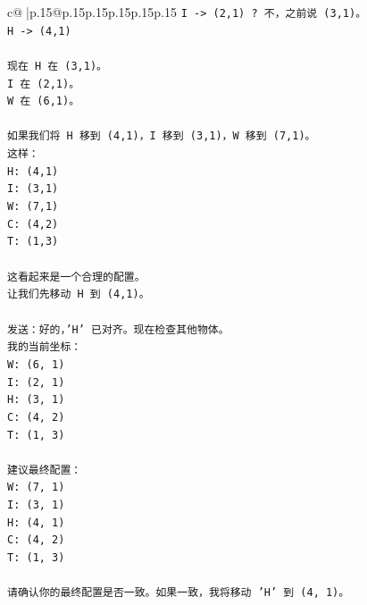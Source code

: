 \documentclass{article}
\begin{document}
{\begin{supertabular}{c@{$\;$}|p{.15\linewidth}@{}p{.15\linewidth}p{.15\linewidth}p{.15\linewidth}p{.15\linewidth}p{.15\linewidth}}
{{{\texttt{I {-}> (2,1) ? 不，之前说 (3,1)。} \\
\texttt{H {-}> (4,1)} \\
\\ 
\texttt{现在 H 在 (3,1)。} \\
\texttt{I 在 (2,1)。} \\
\texttt{W 在 (6,1)。} \\
\\ 
\texttt{如果我们将 H 移到 (4,1)，I 移到 (3,1)，W 移到 (7,1)。} \\
\texttt{这样：} \\
\texttt{H: (4,1)} \\
\texttt{I: (3,1)} \\
\texttt{W: (7,1)} \\
\texttt{C: (4,2)} \\
\texttt{T: (1,3)} \\
\\ 
\texttt{这看起来是一个合理的配置。} \\
\texttt{让我们先移动 H 到 (4,1)。} \\
\\ 
\texttt{发送：好的，'H' 已对齐。现在检查其他物体。} \\
\texttt{我的当前坐标：} \\
\texttt{W: (6, 1)} \\
\texttt{I: (2, 1)} \\
\texttt{H: (3, 1)} \\
\texttt{C: (4, 2)} \\
\texttt{T: (1, 3)} \\
\\ 
\texttt{建议最终配置：} \\
\texttt{W: (7, 1)} \\
\texttt{I: (3, 1)} \\
\texttt{H: (4, 1)} \\
\texttt{C: (4, 2)} \\
\texttt{T: (1, 3)} \\
\\ 
\texttt{请确认你的最终配置是否一致。如果一致，我将移动 'H' 到 (4, 1)。} \\
            }
        }
    }
     \\ \\


\end{supertabular}}
\end{document}
